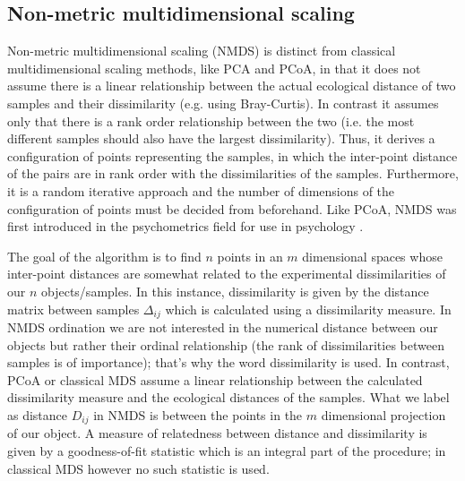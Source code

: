 \subsection{Non-metric multidimensional scaling}
Non-metric multidimensional scaling (NMDS) is distinct from classical multidimensional scaling methods, like PCA and PCoA, in that it does not assume there is a linear relationship between the actual ecological distance of two samples and their dissimilarity (e.g. using Bray-Curtis). In contrast it assumes only that there is a rank order relationship between the two (i.e. the most different samples should also have the largest dissimilarity). Thus, it derives a configuration of points representing the samples, in which the inter-point distance of the pairs are in rank order with the dissimilarities of the samples.
Furthermore, it is a random iterative approach and the number of dimensions of the configuration of points must be decided from beforehand. Like PCoA, NMDS was first introduced in the psychometrics field for use in psychology \cite{kruskal_multidimensional_1964}.

The goal of the algorithm is to find $n$ points in an $m$ dimensional spaces whose inter-point distances are somewhat related to the experimental dissimilarities of our $n$ objects/samples. In this instance, dissimilarity is given by the distance matrix between samples $\Delta_{ij}$ which is calculated using a dissimilarity measure. In NMDS ordination we are not interested in the numerical distance between our objects but rather their ordinal relationship (the rank of dissimilarities between samples is of importance); that's why the word dissimilarity is used. In contrast, PCoA or classical MDS assume a linear relationship between the calculated dissimilarity measure and the ecological distances of the samples. What we label as distance ${D}_{ij}$ in NMDS is between the points in the $m$ dimensional projection of our object. A measure of relatedness between distance and dissimilarity is given by a goodness-of-fit statistic which is an integral part of the procedure; in classical MDS however no such statistic is used.

